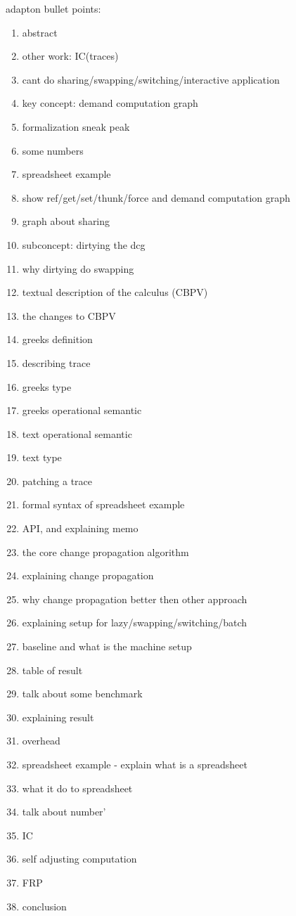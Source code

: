 \documentclass[acmsmall]{acmart}
\begin{document}
	adapton bullet points:
	\begin{enumerate}
		\item abstract
		\item other work: IC(traces)
		\item cant do sharing/swapping/switching/interactive application
		\item key concept: demand computation graph
		\item formalization sneak peak
		\item some numbers
		\item spreadsheet example
		
		\item show ref/get/set/thunk/force and demand computation graph
		\item graph about sharing
		\item subconcept: dirtying the dcg
		\item why dirtying do swapping
		
		
		\item textual description of the calculus (CBPV)
		\item the changes to CBPV
		\item greeks definition
		\item describing trace
		\item greeks type
		\item greeks operational semantic
		\item text operational semantic
		\item text type
		
		\item patching a trace
		\item formal syntax of spreadsheet example
		\item API, and explaining memo
		\item the core change propagation algorithm
		\item explaining change propagation
		\item why change propagation better then other approach

		\item explaining setup for lazy/swapping/switching/batch
		\item baseline and what is the machine setup
		\item table of result
		\item talk about some benchmark
		\item explaining result
		\item overhead
		\item spreadsheet example - explain what is a spreadsheet
		\item what it do to spreadsheet
		\item talk about number'
		
		\item IC
		\item self adjusting computation
		\item FRP
		\item conclusion
	\end{enumerate}
\end{document}
